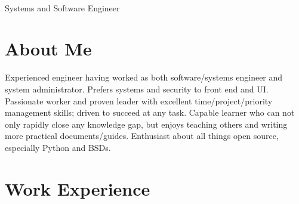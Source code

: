\documentclass[10pt]{article} %
\begin{document}
\color{text1} %


\par{\\ %
{\color{headings} Systems and Software Engineer}\\[15pt]\par} 
	

\begin{minipage}[t]{0.5\textwidth} %
\vspace{0pt} %
	
\section{About Me}
Experienced engineer having worked as both software/systems engineer and system administrator. Prefers systems and security to front end and UI. Passionate worker and proven leader with excellent time/project/priority management skills; driven to succeed at any task. Capable learner who can not only rapidly close any knowledge gap, but enjoys teaching others and writing more practical documents/guides. Enthusiast about all things open source, especially Python and BSDs. 


\section{Work Experience} 



\end{minipage}
\end{document}
